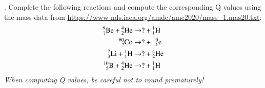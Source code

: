 .
Complete the following reactions and compute the corresponding Q values using the mass data from \url{https://www-nds.iaea.org/amdc/ame2020/mass_1.mas20.txt}:
\begin{equation*}
 \begin{split}
  \isoAZ{Be}{9}{?} + \isoAZ{He}{4}{2} &\rightarrow ? + \isoAZ{H}{1}{1} \\
  \isoAZ{Co}{60}{?} &\rightarrow ? + \isoAZ{e}{0}{-1} \\
  \isoAZ{Li}{7}{3} + \isoAZ{H}{1}{1} &\rightarrow ? + \isoAZ{He}{4}{2} \\
  \isoAZ{B}{10}{5} + \isoAZ{He}{4}{2} &\rightarrow ? + \isoAZ{H}{1}{1} \\
 \end{split}
\end{equation*}
{\it When computing Q values, be careful not to round prematurely!}

